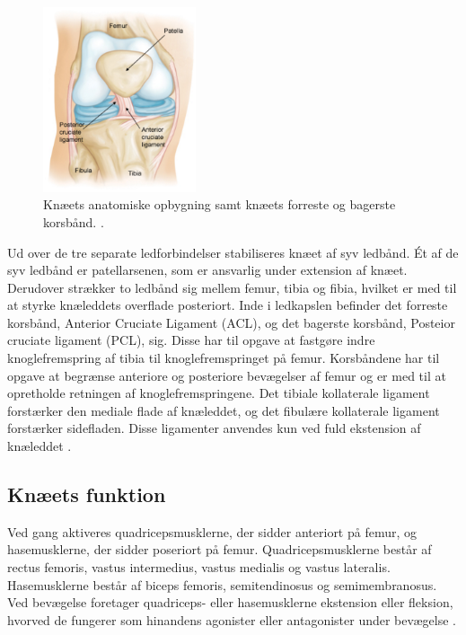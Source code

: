 \begin{figure}[H]
\centering
\includegraphics[width=0.4\textwidth]{figures/knae_anatomi}
\caption{Knæets anatomiske opbygning samt knæets forreste og bagerste korsbånd. \citep{aaos2014}.}
\label{fig:knae_anatomi}
\end{figure} 

\noindent
Ud over de tre separate ledforbindelser stabiliseres knæet af syv ledbånd. Ét af de syv ledbånd er patellarsenen, som er ansvarlig under extension af knæet. Derudover strækker to ledbånd sig mellem femur, tibia og fibia, hvilket er med til at styrke knæleddets overflade posteriort. 
Inde i ledkapslen befinder det forreste korsbånd, Anterior Cruciate Ligament (ACL), og det bagerste korsbånd, Posteior cruciate ligament (PCL), sig. Disse har til opgave at fastgøre indre knoglefremspring af tibia til knoglefremspringet på femur. 
Korsbåndene har til opgave at begrænse anteriore og posteriore bevægelser af femur og er med til at opretholde retningen af knoglefremspringene. 
Det tibiale kollaterale ligament forstærker den mediale flade af knæleddet, og det fibulære kollaterale ligament forstærker sidefladen. Disse ligamenter anvendes kun ved fuld ekstension af knæleddet \citep{martini2012}.

\subsection{Knæets funktion}
Ved gang aktiveres quadricepsmusklerne, der sidder anteriort på femur, og hasemusklerne, der sidder poseriort på femur. Quadricepsmusklerne består af rectus femoris, vastus intermedius, vastus medialis og vastus lateralis. 
Hasemusklerne består af biceps femoris, semitendinosus og semimembranosus. 
Ved bevægelse foretager quadriceps- eller hasemusklerne ekstension eller fleksion, hvorved de fungerer som hinandens agonister eller antagonister under bevægelse \citep{martini2012}. 

